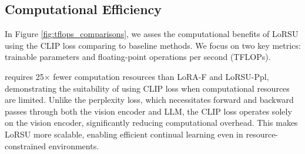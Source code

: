 
\subsection{Computational Efficiency}
In Figure \ref{fig:tflops_comparisons}, we asses the computational benefits of LoRSU using the CLIP loss comparing to baseline methods. We focus on two key metrics: trainable parameters and floating-point operations per second (TFLOPs). 

\ours requires 25× fewer computation resources than LoRA-F and LoRSU-Ppl, demonstrating the suitability of using CLIP loss when computational resources are limited. Unlike the perplexity loss, which necessitates forward and backward passes through both the vision encoder and LLM, the CLIP loss operates solely on the vision encoder, significantly reducing computational overhead. This makes LoRSU more scalable, enabling efficient continual learning even in resource-constrained environments.
